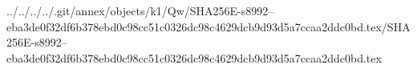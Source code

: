 ../../../../.git/annex/objects/k1/Qw/SHA256E-s8992--eba3de0f32df6b378ebd0c98cc51c0326dc98c4629dcb9d93d5a7ccaa2ddc0bd.tex/SHA256E-s8992--eba3de0f32df6b378ebd0c98cc51c0326dc98c4629dcb9d93d5a7ccaa2ddc0bd.tex